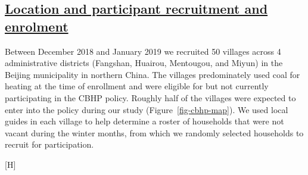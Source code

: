 \documentclass[
  letterpaper,
  DIV=11,
  numbers=noendperiod]{scrartcl}
\makeatletter
\renewenvironment{figure}%
   {\renewcommand\familydefault\sfdefault
    \@float{figure}}
   {\end@float}
\providecommand{\DIFadd}[1]{{\protect\color{blue}\underline{#1}}} %
\providecommand{\DIFaddbegin}{} %
\providecommand{\DIFaddend}{} %
\providecommand{\DIFdelbegin}{} %
\providecommand{\DIFdelend}{} %
\providecommand{\DIFaddbeginFL}{} %
\providecommand{\DIFaddendFL}{} %
\providecommand{\DIFdelbeginFL}{} %
\providecommand{\DIFdelendFL}{} %
\newcommand{\DIFscaledelfig}{0.5}
\newlength{\DIFdelgraphicswidth} %
\newlength{\DIFdelgraphicsheight} %
\newcommand{\DIFaddincludegraphics}[2][]{{\color{blue}\fbox{\DIFOincludegraphics[#1]{#2}}}} %
\newcommand{\DIFdelincludegraphics}[2][]{%
\sbox{\DIFdelgraphicsbox}{\DIFOincludegraphics[#1]{#2}}%
\settoboxwidth{\DIFdelgraphicswidth}{\DIFdelgraphicsbox} %
\settoboxtotalheight{\DIFdelgraphicsheight}{\DIFdelgraphicsbox} %
\scalebox{\DIFscaledelfig}{%
\parbox[b]{\DIFdelgraphicswidth}{\usebox{\DIFdelgraphicsbox}\\[-\baselineskip] \rule{\DIFdelgraphicswidth}{0em}}\llap{\resizebox{\DIFdelgraphicswidth}{\DIFdelgraphicsheight}{%
\setlength{\unitlength}{\DIFdelgraphicswidth}%
\begin{picture}(1,1)%
\thicklines\linethickness{2pt} %
{\color[rgb]{1,0,0}\put(0,0){\framebox(1,1){}}}%
{\color[rgb]{1,0,0}\put(0,0){\line( 1,1){1}}}%
{\color[rgb]{1,0,0}\put(0,1){\line(1,-1){1}}}%
\end{picture}%
}\hspace*{3pt}}} %
} %
\DeclareRobustCommand{\DIFaddbegin}{\DIFOaddbegin \let\includegraphics\DIFaddincludegraphics} %
\DeclareRobustCommand{\DIFaddend}{\DIFOaddend \let\includegraphics\DIFOincludegraphics} %
\DeclareRobustCommand{\DIFdelbegin}{\DIFOdelbegin \let\includegraphics\DIFdelincludegraphics} %
\DeclareRobustCommand{\DIFdelend}{\DIFOaddend \let\includegraphics\DIFOincludegraphics} %
\DeclareRobustCommand{\DIFaddbeginFL}{\DIFOaddbeginFL \let\includegraphics\DIFaddincludegraphics} %
\DeclareRobustCommand{\DIFaddendFL}{\DIFOaddendFL \let\includegraphics\DIFOincludegraphics} %
\DeclareRobustCommand{\DIFdelbeginFL}{\DIFOdelbeginFL \let\includegraphics\DIFdelincludegraphics} %
\DeclareRobustCommand{\DIFdelendFL}{\DIFOaddendFL \let\includegraphics\DIFOincludegraphics} %
\makeatother
\begin{document}
\DIFdelbegin %
\DIFdelend \DIFaddbegin \subsection{\DIFadd{Location and participant recruitment and
enrolment}}\label{location-and-participant-recruitment-and-enrolment}
\DIFaddend 

Between December 2018 and January 2019 we recruited 50 villages across 4
administrative districts (Fangshan, Huairou, Mentougou, and Miyun) in
the Beijing municipality in northern China. The villages predominately
used coal for heating at the time of enrollment and were eligible for
but not currently participating in the CBHP policy. Roughly half of the
villages were expected to enter into the policy during our study
(Figure~\ref{fig-cbhp-map}). We used local guides in each village to
help determine a roster of households that were not vacant during the
winter months, from which we randomly selected households to recruit for
participation.

\begin{figure}[H]

\DIFdelbeginFL %
\DIFdelendFL \DIFaddbeginFL {}
\DIFaddendFL 

\DIFdelbeginFL %

\DIFdelendFL \caption{\label{fig-cbhp-map}Map of village implementation of CBHP
policy}

\end{figure}%
\end{document}
